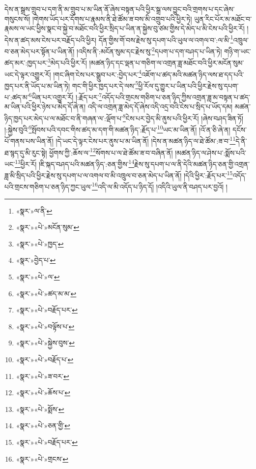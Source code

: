 དེས་ན་སྒྲས་གྲུབ་པ་དག་ནི་མ་གྲུབ་པ་མ་ཡིན་ནོ་ཞེས་བསྟན་པའི་ཕྱིར་སྒྲ་ལས་བྱུང་བའི་གྲགས་པ་དང་ཞེས་གསུངས་སོ། །གེགས་ཡོད་པར་དོགས་པ་རྣམས་ནི་ཐེ་ཚོམ་ཟ་བས་མི་འགྲུབ་པའི་ཕྱིར་ཏེ། ཡུན་རིང་པོར་མ་མཐོང་བ་རྣམས་ལ་ཡང་ཕྱིས་སྣང་བ་སྐྱེ་བ་མཐོང་བའི་ཕྱིར་སྲིད་པ་ཡིན་ན་སྐྱེས་བུ་ཙམ་གྱིས་དེ་མེད་པ་མི་ངེས་པའི་ཕྱིར་རོ། །དེས་ན་ཚད་མས་ངེས་པར་བརྗོད་པའི་ཕྱིར། དོན་གྱིས་གོ་བས་རྗེས་སུ་དཔག་པའི་ཡུལ་ལ་འགལ་བ་:ལ་མི་\footnote{«སྣར་»ལ་ནི་}འཁྲུལ་བ་ཅན་མེད་པར་སྟོན་པ་ཡིན་ནོ། །འདིས་ནི་:མངོན་སུམ་དང་རྗེས་སུ་\footnote{«སྣར་»«པེ་»མངོན་སུམ་}དཔག་པ་དག་བཤད་པ་ཡིན་ཏེ། གཉི་ག་ཡང་ཚད་མར་:ཁྱད་པར་\footnote{«སྣར་»«པེ་»ཁྱད་}མེད་པའི་ཕྱིར་རོ། །མཚན་ཉིད་དང་ལྡན་པ་གཅིག་ལ་འགྲན་ཟླ་མཐོང་བའི་ཕྱིར་མངོན་སུམ་ཡང་དེ་ལྟར་འགྱུར་རོ། །གང་ཞིག་ངེས་པར་སྒྲུབ་པར་:བྱེད་པར་\footnote{«སྣར་»བྱེད་པ་}འཇོག་པ་ཚད་མའི་མཚན་ཉིད་ལས་ཐ་དད་པའི་ཁྱད་པར་ནི་ཡོད་པ་མ་ཡིན་ཏེ། གང་གི་ཕྱིར་ཁྱད་པར་དེ་ལས་\footnote{«སྣར་»«པེ་»ལ་}ཕྱི་རོལ་དུ་གྱུར་པ་ཡིན་པའི་ཕྱིར་རྗེས་སུ་དཔག་པ་:ཚད་མ་\footnote{«སྣར་»«པེ་»ཚད་མ་མ་}ཡིན་པར་འགྱུར་རོ། །:རྗོད་པར་\footnote{«སྣར་»«པེ་»བརྗོད་པར་}འདོད་པའི་གྲངས་གཅིག་པ་ཅན་ཉིད་ཀྱིས་འགྲན་ཟླ་མ་བསྟན་པ་ཚད་མ་ཡིན་པའི་ཕྱིར་ཉེས་པ་མེད་དོ་ཞེ་ན། འདི་ལ་འགྲན་ཟླ་མེད་དོ་ཞེས་འདི་འདྲ་བའི་ངེས་པ་སྲིད་པ་ཡོད་དམ། མཚན་ཉིད་ཁྱད་པར་མེད་པ་ལ་མཐོང་བ་ནི་གཞན་ལ་:ལྡོག་པ་\footnote{«སྣར་»«པེ་»བལྟོས་པ་}ངེས་པར་བྱེད་མི་ནུས་པའི་ཕྱིར་རོ། །ཞེས་བཤད་ཟིན་ཏོ། །:སྐྱེས་བུའི་\footnote{«སྣར་»«པེ་»སྐྱེས་བུས་}སྤོབས་པའི་དབང་གིས་ཚད་མ་དག་གི་མཚན་ཉིད་:རྗོད་པ་\footnote{«སྣར་»«པེ་»བརྗོད་པ་}ཡང་མ་ཡིན་ནོ། །འོ་ན་ཅི་ཞེ་ན། དངོས་པོ་གནས་པས་ཡིན་ནོ། །དེ་ཡང་དེ་ལྟར་ངེས་པར་ནུས་པ་མ་ཡིན་ནོ། །དེས་ན་མཚན་ཉིད་ལ་ཐེ་ཚོམ་:ཟ་བ་\footnote{«སྣར་»«པེ་»ཟ་བར་}དེ་ནི་ཐ་སྙད་དུ་མི་རུང་སྟེ། ཕྱོགས་ཀྱི་:ཆོས་ལ་\footnote{«སྣར་»«པེ་»ཆོས་པ་}སོགས་པ་ལ་ཐེ་ཚོམ་ཟ་བ་བཞིན་ནོ། །མཚན་ཉིད་ལ་ཤེས་པ་:སྨོས་པའི་ཡང་\footnote{«སྣར་»«པེ་»སྨོས་}ཕྱིར་རོ། །ཇི་སྐད་བཤད་པའི་མཚན་ཉིད་:ཅན་གྱིས་\footnote{«སྣར་»«པེ་»ཅན་གྱི་}རྗེས་སུ་དཔག་པ་ལ་ནི་དེའི་མཚན་ཉིད་ཅན་གྱི་འགྲན་ཟླ་མི་སྲིད་པའི་ཕྱིར་རྗེས་སུ་དཔག་པ་ལ་འགལ་བ་མི་འཁྲུལ་བ་ཅན་མེད་པ་ཡིན་ནོ། །དེའི་ཕྱིར་:རྗོད་པར་\footnote{«སྣར་»«པེ་»བརྗོད་པར་}འདོད་པའི་གྲངས་གཅིག་པ་ཅན་ཉིད་ཀྱང་ཡུལ་\footnote{«སྣར་»«པེ་»གྲངས་}འདི་ལ་མི་འདོད་པ་ཉིད་དོ། །འདིའི་ཡུལ་ནི་བཤད་པར་བྱའོ། །
